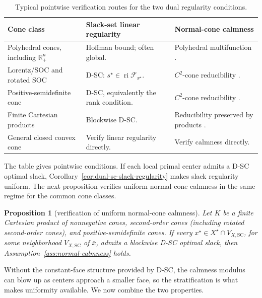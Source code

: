 \documentclass[letterpaper]{article} %
\newtheorem{proposition}[theorem]{Proposition}
\theoremstyle{definition}
\theoremstyle{remark}
\begin{document}
\begin{table}[H]
\centering
\small{}
\caption{Typical pointwise verification routes for the two dual regularity
conditions.}
\label{tab:dual-regularity-verification}
\renewcommand{\arraystretch}{1.12}
\begin{tabularx}{\textwidth}{>{\raggedright\arraybackslash}p{}
    >{\raggedright\arraybackslash}X
    >{\raggedright\arraybackslash}X}
\toprule
Cone class
& Slack-set linear regularity
& Normal-cone calmness \\
\midrule
Polyhedral cones, including $\mathbb R_+^n$
& Hoffman bound; often global.
& Polyhedral multifunction \cite{robinson1981continuity}. \\
Lorentz/SOC and rotated SOC
& D-SC:
  $s^\star\in\operatorname{ri}\mathcal F_{x^\star}$.
& $C^2$-cone reducibility \cite{liu2019graphical}. \\
Positive-semidefinite cone
& D-SC, equivalently the rank condition.
& $C^2$-cone reducibility \cite{liu2019graphical}. \\
Finite Cartesian products
& Blockwise D-SC.
& Reducibility preserved by products \cite{liu2019graphical}. \\
General closed convex cone
& Verify linear regularity directly.
& Verify calmness directly. \\
\bottomrule
\end{tabularx}
\end{table}

The table gives pointwise conditions.  If each local primal center admits a
D-SC optimal slack, Corollary~\ref{cor:dual-sc-slack-regularity} makes slack
regularity uniform.  The next proposition verifies uniform normal-cone
calmness in the same regime for the common cone classes.

\begin{proposition}[verification of uniform normal-cone calmness]
\label{prop:uniform-normal-calmness}
Let $K$ be a finite Cartesian product of nonnegative cones, second-order
cones (including rotated second-order cones), and positive-semidefinite
cones.  If every $x^\star\in X^\star\cap V_{X,\mathrm{SC}}$, for some
neighborhood $V_{X,\mathrm{SC}}$ of $\bar x$, admits a blockwise D-SC
optimal slack, then Assumption~\ref{ass:normal-calmness} holds.
\end{proposition}

Without the constant-face structure provided by D-SC, the calmness modulus
can blow up as centers approach a smaller face, so the stratification is
what makes uniformity available.  We now combine the two properties.
\end{document}
